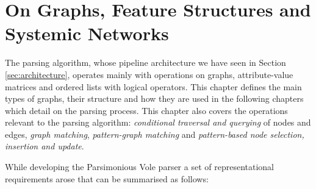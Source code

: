 \chapter{On Graphs, Feature Structures and Systemic Networks}
\label{ch:data-structures}

%

The parsing algorithm, whose pipeline architecture we have seen in Section \ref{sec:architecture}, operates mainly with operations on graphs, attribute-value matrices and ordered lists with logical operators. This chapter defines the main types of graphs, their structure and how they are used in the following chapters which detail on the parsing process. This chapter also covers the operations relevant to the parsing algorithm: \textit{conditional traversal and querying} of nodes and edges, \textit{graph matching}, \textit{pattern-graph matching} and \textit{pattern-based node selection, insertion and update}.

While developing the Parsimonious Vole parser a set of representational requirements arose that can be summarised as follows:


